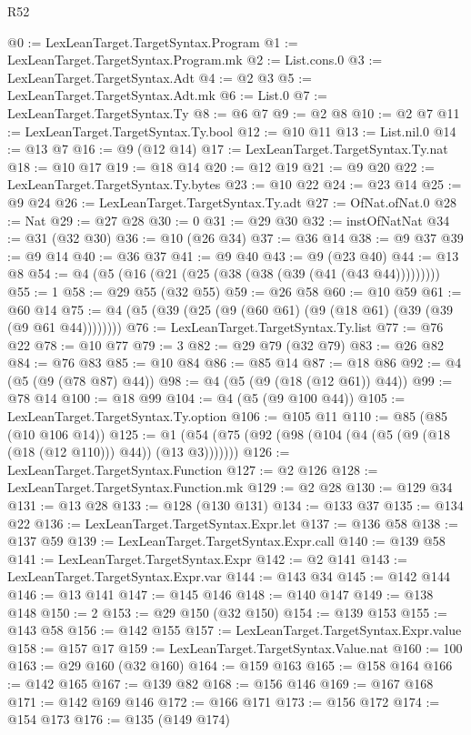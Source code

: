 \begin{lexlean}{R52}
\begin{coremodule}
@0 := LexLeanTarget.TargetSyntax.Program
@1 := LexLeanTarget.TargetSyntax.Program.mk
@2 := List.cons.{0}
@3 := LexLeanTarget.TargetSyntax.Adt
@4 := @2 @3
@5 := LexLeanTarget.TargetSyntax.Adt.mk
@6 := List.{0}
@7 := LexLeanTarget.TargetSyntax.Ty
@8 := @6 @7
@9 := @2 @8
@10 := @2 @7
@11 := LexLeanTarget.TargetSyntax.Ty.bool
@12 := @10 @11
@13 := List.nil.{0}
@14 := @13 @7
@16 := @9 (@12 @14)
@17 := LexLeanTarget.TargetSyntax.Ty.nat
@18 := @10 @17
@19 := @18 @14
@20 := @12 @19
@21 := @9 @20
@22 := LexLeanTarget.TargetSyntax.Ty.bytes
@23 := @10 @22
@24 := @23 @14
@25 := @9 @24
@26 := LexLeanTarget.TargetSyntax.Ty.adt
@27 := OfNat.ofNat.{0}
@28 := Nat
@29 := @27 @28
@30 := 0
@31 := @29 @30
@32 := instOfNatNat
@34 := @31 (@32 @30)
@36 := @10 (@26 @34)
@37 := @36 @14
@38 := @9 @37
@39 := @9 @14
@40 := @36 @37
@41 := @9 @40
@43 := @9 (@23 @40)
@44 := @13 @8
@54 := @4 (@5 (@16 (@21 (@25 (@38 (@38 (@39 (@41 (@43 @44)))))))))
@55 := 1
@58 := @29 @55 (@32 @55)
@59 := @26 @58
@60 := @10 @59
@61 := @60 @14
@75 := @4 (@5 (@39 (@25 (@9 (@60 @61) (@9 (@18 @61) (@39 (@39 (@9 @61 @44))))))))
@76 := LexLeanTarget.TargetSyntax.Ty.list
@77 := @76 @22
@78 := @10 @77
@79 := 3
@82 := @29 @79 (@32 @79)
@83 := @26 @82
@84 := @76 @83
@85 := @10 @84
@86 := @85 @14
@87 := @18 @86
@92 := @4 (@5 (@9 (@78 @87) @44))
@98 := @4 (@5 (@9 (@18 (@12 @61)) @44))
@99 := @78 @14
@100 := @18 @99
@104 := @4 (@5 (@9 @100 @44))
@105 := LexLeanTarget.TargetSyntax.Ty.option
@106 := @105 @11
@110 := @85 (@85 (@10 @106 @14))
@125 := @1 (@54 (@75 (@92 (@98 (@104 (@4 (@5 (@9 (@18 (@18 (@12 @110))) @44)) (@13 @3)))))))
@126 := LexLeanTarget.TargetSyntax.Function
@127 := @2 @126
@128 := LexLeanTarget.TargetSyntax.Function.mk
@129 := @2 @28
@130 := @129 @34
@131 := @13 @28
@133 := @128 (@130 @131)
@134 := @133 @37
@135 := @134 @22
@136 := LexLeanTarget.TargetSyntax.Expr.let
@137 := @136 @58
@138 := @137 @59
@139 := LexLeanTarget.TargetSyntax.Expr.call
@140 := @139 @58
@141 := LexLeanTarget.TargetSyntax.Expr
@142 := @2 @141
@143 := LexLeanTarget.TargetSyntax.Expr.var
@144 := @143 @34
@145 := @142 @144
@146 := @13 @141
@147 := @145 @146
@148 := @140 @147
@149 := @138 @148
@150 := 2
@153 := @29 @150 (@32 @150)
@154 := @139 @153
@155 := @143 @58
@156 := @142 @155
@157 := LexLeanTarget.TargetSyntax.Expr.value
@158 := @157 @17
@159 := LexLeanTarget.TargetSyntax.Value.nat
@160 := 100
@163 := @29 @160 (@32 @160)
@164 := @159 @163
@165 := @158 @164
@166 := @142 @165
@167 := @139 @82
@168 := @156 @146
@169 := @167 @168
@171 := @142 @169 @146
@172 := @166 @171
@173 := @156 @172
@174 := @154 @173
@176 := @135 (@149 @174)

\end{coremodule}
\end{lexlean}
